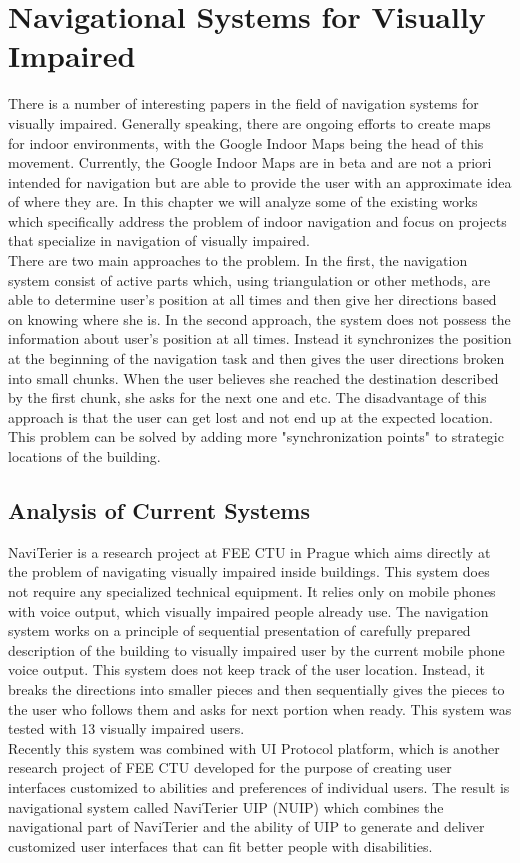 \chapter{Navigational Systems for Visually Impaired}
There is a number of interesting papers in the field of navigation systems for visually impaired. Generally speaking, there are ongoing efforts to create maps for indoor environments, with the Google Indoor Maps being the head of this movement. Currently, the Google Indoor Maps are in beta and are not a priori intended for navigation but are able to provide the user with an approximate idea of where they are. In this chapter we will analyze some of the existing works which specifically address the problem of indoor navigation and focus on projects that specialize in navigation of visually impaired.\\
There are two main approaches to the problem. In the first, the navigation system consist of active parts which, using triangulation or other methods, are able to determine user's position at all times and then give her directions based on knowing where she is. In the second approach, the system does not possess the information about user's position at all times. Instead it synchronizes the position at the beginning of the navigation task and then gives the user directions broken into small chunks. When the user believes she reached the destination described by the first chunk, she asks for the next one and etc. The disadvantage of this approach is that the user can get lost and not end up at the expected location. This problem can be solved by adding more "synchronization points" to strategic locations of the building.

\section{Analysis of Current Systems}
NaviTerier \cite{naviterier} is a research project at FEE CTU in Prague which aims directly at the problem of navigating visually impaired inside buildings. This system does not require any specialized technical equipment. It relies only on mobile phones with voice output, which visually impaired people already use. The navigation system works on a principle of sequential presentation of carefully prepared description of the building to visually impaired user by the current mobile phone voice output. This system does not keep track of the user location. Instead, it breaks the directions into smaller pieces and then sequentially gives the  pieces to the user who follows them and asks for next portion when ready. This system was tested with 13 visually impaired users.\\
Recently this system was combined with UI Protocol platform, which is another research project of FEE CTU developed for the purpose of creating user interfaces customized to abilities and preferences of individual users. The result is navigational system called NaviTerier UIP (NUIP) \cite{balata} which combines the navigational part of NaviTerier and the ability of UIP to generate and deliver customized user interfaces that can fit better people with disabilities.\\

